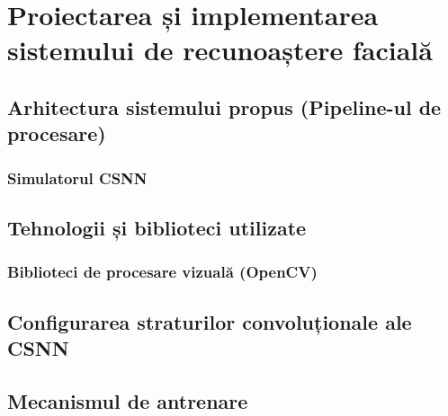 \chapter{Proiectarea și implementarea sistemului de recunoaștere facială}
\section{Arhitectura sistemului propus (Pipeline-ul de procesare)}
\subsection{Simulatorul CSNN}
\section{Tehnologii și biblioteci utilizate}
\subsection{Biblioteci de procesare vizuală (OpenCV)}
\section{Configurarea straturilor convoluționale ale CSNN}
\section{Mecanismul de antrenare}